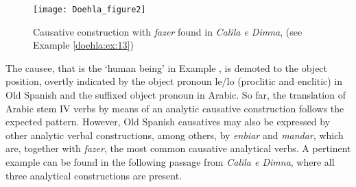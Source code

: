 \documentclass[output=paper]{langscibook}
\begin{document}
\begin{figure}
    \texttt{[image: Doehla\_figure2]}
    \caption{Causative construction with \textit{fazer} found in \textit{Calila e Dimna}, (see Example \ref{doehla:ex:13})} 
    \label{doehla:fig:2}
\end{figure}


The causee, that is the ‘human being’ in Example , is demoted to the object position, overtly indicated by the object pronoun le/lo (proclitic and enclitic) in Old Spanish and the suffixed object pronoun in Arabic. So far, the translation of Arabic stem IV verbs by means of an analytic causative construction follows the expected pattern. However, Old Spanish causatives may also be expressed by other analytic verbal constructions, among others, by \textit{enbiar} and \textit{mandar}, which are, together with \textit{fazer}, the most common causative analytical verbs. A pertinent example can be found in the following passage from \textit{Calila e Dimna}, where all three analytical constructions are present.
\end{document}
